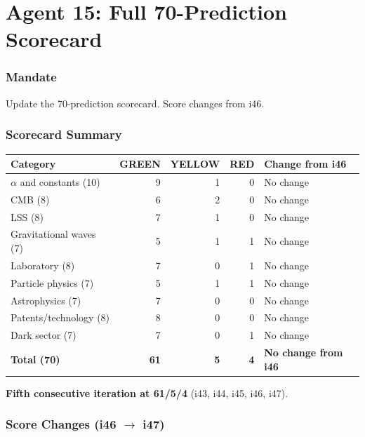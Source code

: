\documentclass[11pt,a4paper]{article}
\newcommand{\GREEN}{\textcolor{dfdgreen}{\textbf{GREEN}}}
\newcommand{\YELLOW}{\textcolor{dfdyellow}{\textbf{YELLOW}}}
\newcommand{\RED}{\textcolor{dfdred}{\textbf{RED}}}
\begin{document}
\part{Agent 15: Full 70-Prediction Scorecard}
\label{part:agent15}

\section{Mandate}

Update the 70-prediction scorecard. Score changes from i46.

\section{Scorecard Summary}

\begin{center}
\begin{tabular}{lrrrl}
\toprule
\textbf{Category} & \textbf{\GREEN} & \textbf{\YELLOW} & \textbf{\RED} & \textbf{Change from i46} \\
\midrule
$\alpha$ and constants (10) & 9 & 1 & 0 & No change \\
CMB (8) & 6 & 2 & 0 & No change \\
LSS (8) & 7 & 1 & 0 & No change \\
Gravitational waves (7) & 5 & 1 & 1 & No change \\
Laboratory (8) & 7 & 0 & 1 & No change \\
Particle physics (7) & 5 & 1 & 1 & No change \\
Astrophysics (7) & 7 & 0 & 0 & No change \\
Patents/technology (8) & 8 & 0 & 0 & No change \\
Dark sector (7) & 7 & 0 & 1 & No change \\
\midrule
\textbf{Total (70)} & \textbf{61} & \textbf{5} & \textbf{4} & \textbf{No change from i46} \\
\bottomrule
\end{tabular}
\end{center}

\textbf{Fifth consecutive iteration at 61/5/4} (i43, i44, i45, i46, i47).

\section{Score Changes (i46 $\to$ i47)}
\end{document}
